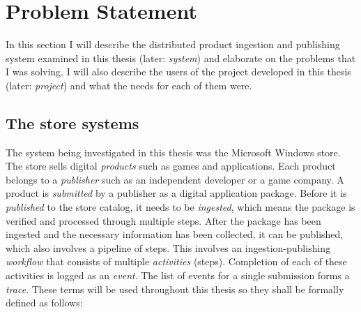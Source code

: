 
\clearpage
\section{Problem Statement}
\label{sec:problem}

In this section I will describe the distributed product ingestion and publishing system examined in this thesis (later: \textit{system})  and elaborate on the 
problems that I was solving. I will also describe the users of the project developed in this thesis (later: \textit{project}) and what the needs for
each of them were. 


\subsection{The store systems}

The system being investigated in this thesis was the Microsoft Windows store.
The store sells digital \emph{products} such as games and applications.
Each product belongs to a \emph{publisher} such as an independent developer or a game company.
A product is \emph{submitted} by a publisher as a digital application package.
Before it is \emph{published} to the store catalog, it needs to be \emph{ingested},
which means the package is verified and processed through multiple steps.
After the package has been ingested and the necessary information has been collected,
it can be published, which also involves a pipeline of steps.
This involves an ingestion-publishing \emph{workflow} that consists of multiple \emph{activities} (steps).
Completion of each of these activities is logged as an \emph{event}.
The list of events for a single submission forms a \emph{trace}.
These terms will be used throughout this thesis so they shall be formally defined as follows:


